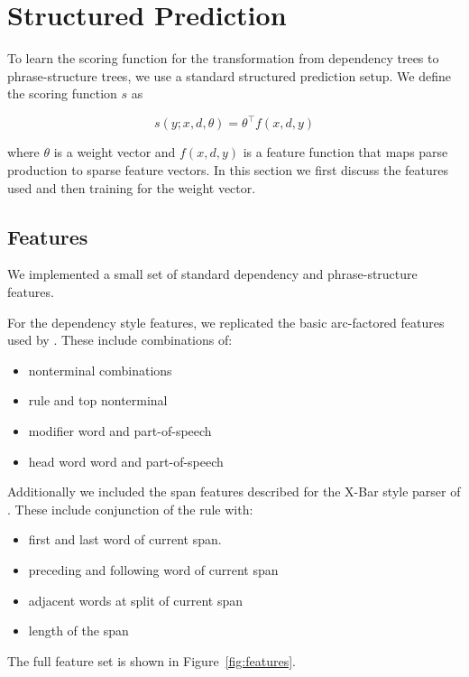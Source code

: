 \documentclass[11pt,letterpaper]{article}
\begin{document}
\section{Structured Prediction}

To learn the scoring function for the transformation from dependency trees to phrase-structure trees,
we use a standard structured prediction setup.
We define the scoring function $s$ as

\[s(y;x, d, \theta) =  \theta^{\top} f(x, d, y) \]

\noindent
where $\theta$ is a weight vector  and $f(x, d, y)$ is a feature function that maps parse production to sparse feature vectors. In this section we first discuss the features used and then training for the weight vector.


\subsection{Features}

We implemented a small set of standard dependency and phrase-structure features.

For the dependency style features, we replicated the basic arc-factored features
used by . These include combinations of:

\begin{itemize}
\item nonterminal combinations
\item rule and top nonterminal
\item modifier word and part-of-speech
\item head word word and part-of-speech
\end{itemize}

Additionally we included the span features described for the X-Bar style
parser of . These include conjunction of the rule
with:

\begin{itemize}
\item first and last word of current span.
\item preceding and following word of current span
\item adjacent words at split of current span
\item length of the span
\end{itemize}


The full feature set  is shown in Figure~\ref{fig:features}.
\end{document}
